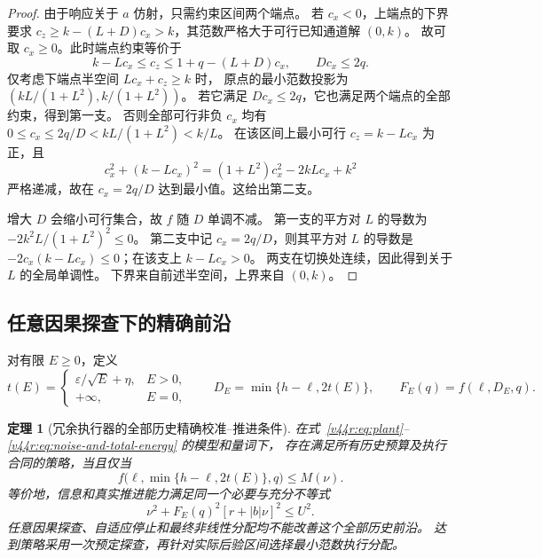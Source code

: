 \documentclass[11pt,a4paper]{article}
\numberwithin{equation}{section}
\newtheorem{theorem}{定理}[section]
\theoremstyle{definition}
\begin{document}
\begin{proof}
由于响应关于 $a$ 仿射，只需约束区间两个端点。
若 $c_x<0$，上端点的下界要求
$c_z\ge k-(L+D)c_x>k$，其范数严格大于可行已知通道解 $(0,k)$。
故可取 $c_x\ge0$。此时端点约束等价于
\[
 k-Lc_x\le c_z\le 1+q-(L+D)c_x,
 \qquad Dc_x\le2q.
\]
仅考虑下端点半空间 $Lc_x+c_z\ge k$ 时，
原点的最小范数投影为
$(kL/(1+L^2),k/(1+L^2))$。
若它满足 $Dc_x\le2q$，它也满足两个端点的全部约束，得到第一支。
否则全部可行非负 $c_x$ 均有
$0\le c_x\le2q/D<kL/(1+L^2)<k/L$。
在该区间上最小可行 $c_z=k-Lc_x$ 为正，且
\[
 c_x^2+(k-Lc_x)^2
 =(1+L^2)c_x^2-2kLc_x+k^2
\]
严格递减，故在 $c_x=2q/D$ 达到最小值。这给出第二支。

增大 $D$ 会缩小可行集合，故 $f$ 随 $D$ 单调不减。
第一支的平方对 $L$ 的导数为
$-2k^2L/(1+L^2)^2\le0$。
第二支中记 $c_x=2q/D$，则其平方对 $L$ 的导数是
$-2c_x(k-Lc_x)\le0$；在该支上 $k-Lc_x>0$。
两支在切换处连续，因此得到关于 $L$ 的全局单调性。
下界来自前述半空间，上界来自 $(0,k)$。
\end{proof}

\subsection{任意因果探查下的精确前沿}

对有限 $E\ge0$，定义
\begin{equation}
 t(E)=
 \begin{cases}
 \varepsilon/\sqrt E+\eta,&E>0,\\
 +\infty,&E=0,
 \end{cases}
 \qquad
 D_E=\min\{h-\ell,2t(E)\},
 \qquad F_E(q)=f(\ell,D_E,q).
 \label{v44r:eq:worst-posterior-width}
\end{equation}

\begin{theorem}[冗余执行器的全部历史精确校准--推进条件]
\label{v44r:thm:exact-frontier}
在式~\eqref{v44r:eq:plant}--\eqref{v44r:eq:noise-and-total-energy} 的模型和量词下，
存在满足所有历史预算及执行合同的策略，当且仅当
\begin{equation}
 \boxed{
 f\bigl(\ell,\min\{h-\ell,2t(E)\},q\bigr)\le M(\nu).}
 \label{v44r:eq:exact-frontier}
\end{equation}
等价地，信息和真实推进能力满足同一个必要与充分不等式
\begin{equation}
 \boxed{\ \nu^2+F_E(q)^2[r+|b|\nu]^2\le U^2.\ }
 \label{v44r:eq:joint-energy-speed-frontier}
\end{equation}
任意因果探查、自适应停止和最终非线性分配均不能改善这个全部历史前沿。
达到策略采用一次预定探查，再针对实际后验区间选择最小范数执行分配。
\end{theorem}
\end{document}
